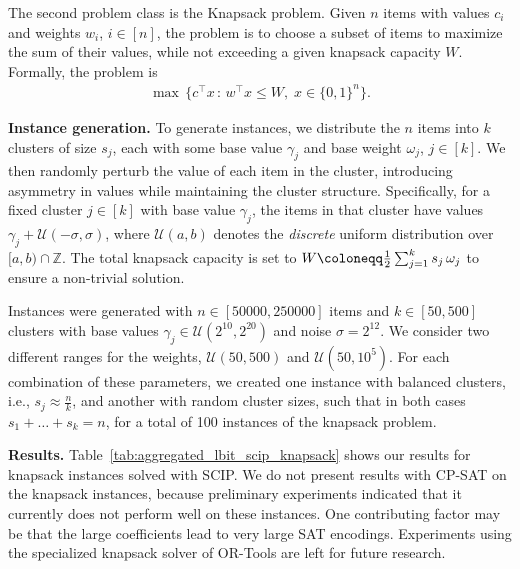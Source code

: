 \documentclass[runningheads]{llncs}
\newcommand{\Z}{\mathds{Z}}
\newcommand{\define}{\coloneqq}
\newcommand{\T}{^\top}
\newcommand{\suchthat}{\,:\,}
\begin{document}
The second problem class is the Knapsack problem. Given $n$ items with values $c_i$ and weights $w_i$, $i \in [n]$, the problem is to choose a subset of items to maximize the sum of their values, while not exceeding a given knapsack capacity $W$.
Formally, the problem is
\begin{align*}
    \max\, \{c\T x \suchthat w\T x \leq W,\; x \in \{0, 1\}^n\}.
\end{align*}

\textbf{Instance generation.}
To generate instances, we distribute the $n$ items into $k$ clusters of size $s_j$, each with some base value $\gamma_j$ and base weight $\omega_j$, $j \in [k]$. We then randomly perturb the value of each item in the cluster, introducing asymmetry in values while maintaining the cluster structure. Specifically, for a fixed cluster $j \in [k]$ with base value $\gamma_j$, the items in that cluster have values $\gamma_j + \mathcal{U}(-\sigma, \sigma)$, where $\mathcal{U}(a,b)$ denotes the \emph{discrete} uniform distribution over $[a, b) \cap \Z$.
The total knapsack capacity is set to $W \define \smash{\frac{1}{2}\sum_{j=1}^k s_j \,\omega_j}$ to ensure a non-trivial solution.

Instances were generated with $n\in[50000, 250000]$ items and $k\in[50, 500]$ clusters with base values $\gamma_j \in \mathcal{U}(2^{10}, 2^{20})$ and noise $\sigma = 2^{12}$. We consider two different ranges for the weights, $\mathcal{U}(50,500)$ and $\mathcal{U}(50,10^5)$. For each combination of these parameters, we created one instance with balanced clusters, i.e., $s_j \approx \frac{n}{k}$, and another with random cluster sizes, such that in both cases $s_1 + \dots + s_k = n$, for a total of 100 instances of the knapsack problem.

\textbf{Results.}\label{sec:results_knapsack}
Table~\ref{tab:aggregated_lbit_scip_knapsack} shows our results for knapsack instances solved with SCIP.
We do not present results with CP-SAT on the knapsack instances, because preliminary experiments indicated that it currently does not perform well on these instances. One contributing factor may be that the large coefficients lead to very large SAT encodings. Experiments using the specialized knapsack solver of OR-Tools are left for future research.
\end{document}
